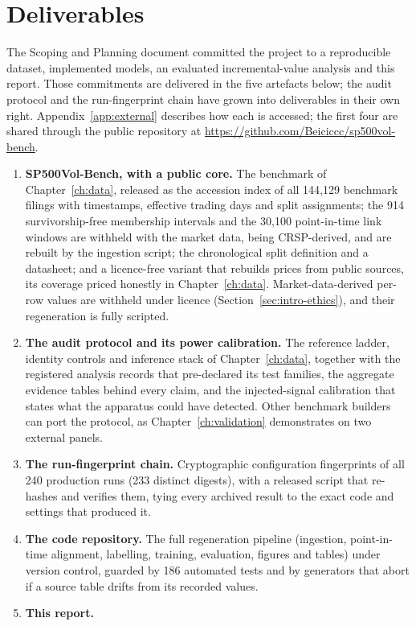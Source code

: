 \section{Deliverables}
\label{sec:intro-deliverables}

The Scoping and Planning document committed the project to a reproducible dataset, implemented models, an evaluated incremental-value analysis and this report. Those commitments are delivered in the five artefacts below; the audit protocol and the run-fingerprint chain have grown into deliverables in their own right. Appendix~\ref{app:external} describes how each is accessed; the first four are shared through the public repository at \url{https://github.com/Beiciccc/sp500vol-bench}.

\begin{enumerate}
  \item \textbf{SP500Vol-Bench, with a public core.} The benchmark of Chapter~\ref{ch:data}, released as the accession index of all 144{,}129 benchmark filings with timestamps, effective trading days and split assignments; %
  the 914 survivorship-free membership intervals and the 30{,}100 point-in-time link windows are withheld with the market data, being CRSP-derived, and are rebuilt by the ingestion script; %
  the chronological split definition and a datasheet; and a licence-free variant that rebuilds prices from public sources, its coverage priced honestly in Chapter~\ref{ch:data}. Market-data-derived per-row values are withheld under licence (Section~\ref{sec:intro-ethics}), and their regeneration is fully scripted.
  \item \textbf{The audit protocol and its power calibration.} The reference ladder, identity controls and inference stack of Chapter~\ref{ch:data}, together with the registered analysis records that pre-declared its test families, the aggregate evidence tables behind every claim, and the injected-signal calibration that states what the apparatus could have detected. Other benchmark builders can port the protocol, as Chapter~\ref{ch:validation} demonstrates on two external panels.
  \item \textbf{The run-fingerprint chain.} Cryptographic configuration fingerprints of all 240 production runs (233 distinct digests), with a released script that re-hashes and verifies them, %
  tying every archived result to the exact code and settings that produced it.
  \item \textbf{The code repository.} The full regeneration pipeline (ingestion, point-in-time alignment, labelling, training, evaluation, figures and tables) under version control, guarded by 186 automated tests %
  and by generators that abort if a source table drifts from its recorded values.
  \item \textbf{This report.}
\end{enumerate}


